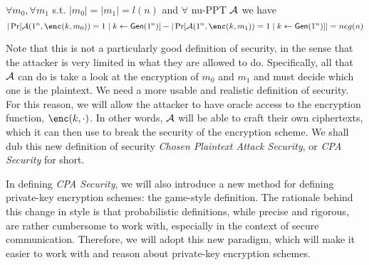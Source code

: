 \begin{definition}
    $\forall m_0, \forall m_1$ s.t. $|m_0| = |m_1|= l(n)$ and $\forall$ nu-PPT $\mathcal{A}$ we have
    $$|\Pr[\ma(1^n, \enc(k, m_0)) = 1 \; | \; k \leftarrow \gen(1^n)] - |\Pr[\ma(1^n, \enc(k, m_1)) = 1 \; | \; k \leftarrow \gen(1^n)]| = neg(n)$$ 
\end{definition}
Note that this is not a particularly good definition of security, in the sense that the attacker is very limited in what they are allowed to do.
Specifically, all that $\mathcal{A}$ can do is take a look at the encryption of $m_0$ and $m_1$ and must decide which one is the plaintext.
We need a more usable and realistic definition of security.
For this reason, we will allow the attacker to have oracle access to the encryption function, $\enc(k, \cdot)$.
In other words, $\mathcal{A}$ will be able to craft their own ciphertexts, which it can then use to break the security of the encryption scheme.
We shall dub this new definition of security \textit{Chosen Plaintext Attack Security}, or \textit{CPA Security} for short.


In defining \textit{CPA Security}, we will also introduce a new method for defining private-key encryption schemes: the game-style definition.
The rationale behind this change in style is that probabilistic definitions, while precise and rigorous, are rather cumbersome to work with, especially in the context of secure communication.
Therefore, we will adopt this new paradigm, which will make it easier to work with and reason about private-key encryption schemes.


